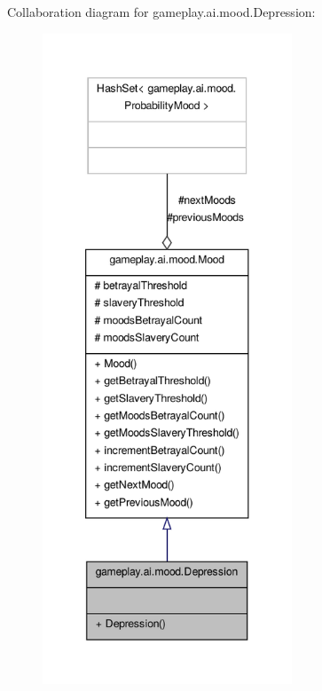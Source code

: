 Collaboration diagram for gameplay.\-ai.\-mood.\-Depression\-:
\nopagebreak
\begin{figure}[H]
\begin{center}
\leavevmode
\includegraphics[height=550pt]{a00108}
\end{center}
\end{figure}

